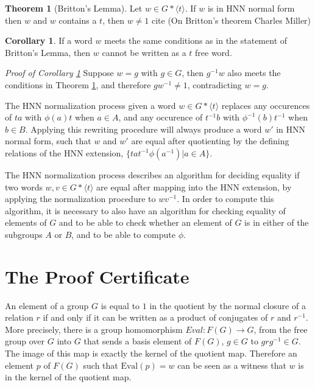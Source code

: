 \documentclass[11pt]{article} %
\theoremstyle{definition}
\newtheorem{theorem}{Theorem}[section]
\theoremstyle{definition}
\newtheorem{corol}{Corollary}[theorem]
\theoremstyle{definition}
\theoremstyle{definition}
\theoremstyle{definition}
\theoremstyle{definition}
\begin{document}
\begin{theorem}[Britton's Lemma]\label{britton}
  Let $w \in G \ast \langle t \rangle$.
  If $w$ is in HNN normal form then $w$
  and $w$ contains a $t$, then $w \ne 1$
  cite (On Britton's theorem Charles Miller)
\end{theorem}

\begin{corol}\label{genbritton}
  If a word $w$ meets the same conditions as in the statement of Britton's Lemma,
  then $w$ cannot be written as a $t$ free word.
\end{corol}
\textit{Proof of Corollary \ref{genbritton}} Suppose $w = g$ with $g \in G$,
then $g^{-1}w$ also meets the conditions
in Theorem \ref{britton}, and therefore $gw^{-1}\ne 1$, contradicting $w = g$.

The HNN normalization process given a word $w \in G \ast \langle t \rangle$
replaces any occurences of $ta$ with $\phi(a)t$ when $a \in A$, and
any occurence of $t^{-1}b$ with $\phi^{-1}(b)t^{-1}$ when $b \in B$.
Applying this rewriting procedure will always produce a word $w'$ in HNN normal form,
such that $w$ and $w'$ are equal after quotienting by the defining relations
of the HNN extension, $\{ta t^{-1} \phi(a^{-1}) | a \in A\}$.

The HNN normalization process describes an algorithm for deciding
equality if two words $w, v \in G \ast \langle t \rangle$ are equal
after mapping into the HNN extension, by applying the normalization procedure to
 $wv^{-1}$.
In order to compute this algorithm, it is necessary to also
have an algorithm for checking equality of elements of $G$ and
to be able to check whether an element of $G$ is in either of the subgroups $A$ or $B$,
and to be able to compute $\phi$.

\section{The Proof Certificate}

An element of a group $G$ is equal to $1$ in the quotient by the normal closure
of a relation $r$ if and only if it can be written as a product of conjugates of $r$ and $r^{-1}$.
More precisely, there is a group homomorphism $\textit{Eval} : F(G) \to G$, from the free group
over $G$ into $G$ that sends a basis element of $F(G)$,
$g \in G$ to $grg^{-1} \in G$. The image of this map is exactly the kernel of the quotient map.
Therefore an element $p$ of $F(G)$ such that $\text{Eval}(p) = w$
can be seen as a witness that $w$ is in the kernel of the quotient map.
\end{document}
